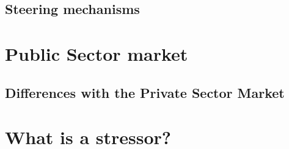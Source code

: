 \subsection{Steering mechanisms}
\label{sub:tbeasteering}

\section{Public Sector market}
\label{sec:tbpsmarket}

\subsection{Differences with the Private Sector Market}
\label{sub:tbdifferenceprivatesector}

\section{What is a stressor?}
\label{sec:stressor}

